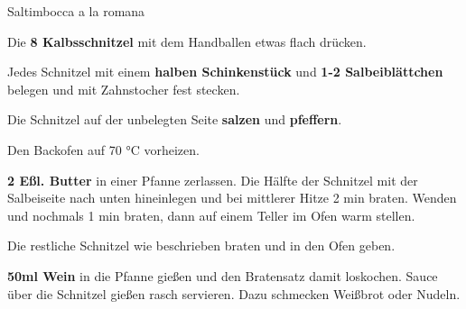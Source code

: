 \begin{recipe}[]{Saltimbocca a la romana} %

\step
Die \textbf{8 Kalbsschnitzel} mit dem Handballen etwas flach drücken.

\step
Jedes Schnitzel mit einem \textbf{halben Schinkenstück} und \textbf{1-2 Salbeiblättchen} belegen und mit Zahnstocher fest stecken. 

\step
Die Schnitzel auf der unbelegten Seite \textbf{salzen} und \textbf{pfeffern}. 

\step
Den Backofen auf 70 °C vorheizen. 

\step
\textbf{2 Eßl. Butter} in einer Pfanne zerlassen. Die Hälfte der Schnitzel mit der Salbeiseite nach unten hineinlegen und bei mittlerer Hitze 2 min braten. Wenden und nochmals 1 min braten, dann auf einem Teller im Ofen warm stellen.

\step
Die restliche Schnitzel wie beschrieben braten und in den Ofen geben.

\step
\textbf{50ml Wein} in die Pfanne gießen und den Bratensatz damit loskochen. Sauce über die Schnitzel gießen rasch servieren. Dazu schmecken Weißbrot oder Nudeln.

\end{recipe}